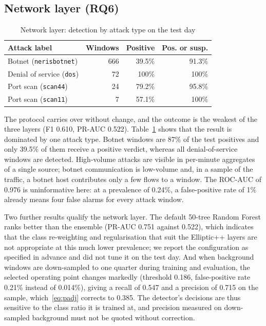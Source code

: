 \subsection{Network layer (RQ6)}\label{sec:res-net}

\begin{table}[t]
\caption{Network layer: detection by attack type on the test day}\label{tab:attacks}
\centering
\setlength{\tabcolsep}{3pt}
\begin{tabular}{lrrr}
\toprule
Attack label & Windows & Positive & Pos. or susp. \\
\midrule
Botnet (\texttt{nerisbotnet}) & 666 & 39.5\% & 91.3\% \\
Denial of service (\texttt{dos}) & 72 & 100\% & 100\% \\
Port scan (\texttt{scan44}) & 24 & 79.2\% & 95.8\% \\
Port scan (\texttt{scan11}) & 7 & 57.1\% & 100\% \\
\bottomrule
\end{tabular}
\end{table}

The protocol carries over without change, and the outcome is the weakest of the three layers (F1 0.610, PR-AUC 0.522). Table~\ref{tab:attacks} shows that the result is dominated by one attack type. Botnet windows are 87\% of the test positives and only 39.5\% of them receive a positive verdict, whereas all denial-of-service windows are detected. High-volume attacks are visible in per-minute aggregates of a single source; botnet communication is low-volume and, in a sample of the traffic, a botnet host contributes only a few flows to a window. The ROC-AUC of 0.976 is uninformative here: at a prevalence of 0.24\%, a false-positive rate of 1\% already means four false alarms for every attack window.

Two further results qualify the network layer. The default 50-tree Random Forest ranks better than the ensemble (PR-AUC 0.751 against 0.522), which indicates that the class re-weighting and regularisation that suit the Elliptic++ layers are not appropriate at this much lower prevalence; we report the configuration as specified in advance and did not tune it on the test day. And when background windows are down-sampled to one quarter during training and evaluation, the selected operating point changes markedly (threshold 0.186, false-positive rate 0.21\% instead of 0.014\%), giving a recall of 0.547 and a precision of 0.715 on the sample, which~\eqref{eq:padj} corrects to 0.385. The detector's decisions are thus sensitive to the class ratio it is trained at, and precision measured on down-sampled background must not be quoted without correction.
